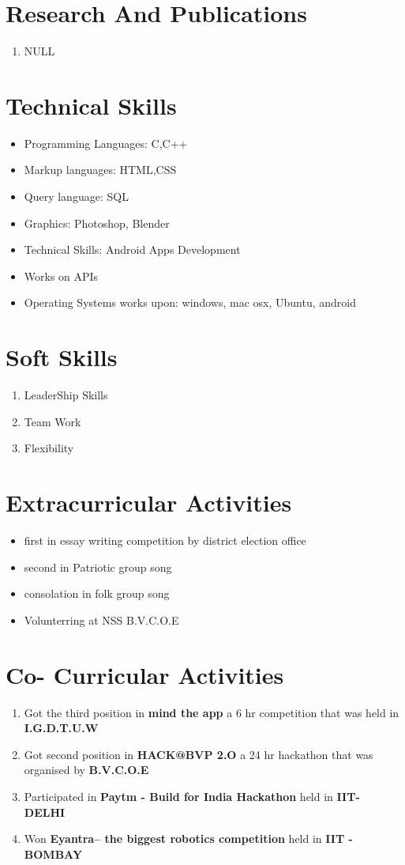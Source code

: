 \documentclass{article}
\begin{document}
	\section{Research And Publications}
		\begin{enumerate}
			\item {NULL}
		\end{enumerate}
	\section{Technical Skills}
		\begin{itemize}
			\item {Programming Languages: C,C++}
			\item {Markup languages: HTML,CSS}
			\item {Query language: SQL}
			\item {Graphics: Photoshop, Blender}
			\item {Technical Skills: Android Apps Development}
			\item {Works on APIs}
			\item {Operating Systems works upon: windows, mac osx, Ubuntu, android}
		\end{itemize}
	\section{Soft Skills}
		\begin{enumerate}
			\item {LeaderShip Skills}
			\item {Team Work}
			\item {Flexibility}
		\end{enumerate}
	\section{Extracurricular Activities}
		\begin{itemize}
			\item { first in essay writing competition by district election office }
			\item { second in Patriotic group song}
			\item { consolation in folk group song}
			\item { Volunterring at NSS B.V.C.O.E}
		\end{itemize}
	\section{Co- Curricular Activities}
		\begin{enumerate}
			\item{ Got the third position in \textbf{mind the app} a 6 hr competition that was held in \textbf{I.G.D.T.U.W }}
			\item {Got second position in \textbf{HACK@BVP 2.O} a 24 hr hackathon that was organised by \textbf{B.V.C.O.E}}
			\item { Participated in \textbf{Paytm - Build for India Hackathon} held in \textbf{IIT- DELHI}}
			\item { Won \textbf{Eyantra-- the biggest robotics competition} held in \textbf{IIT - BOMBAY}}
		\end{enumerate}
\end{document}
